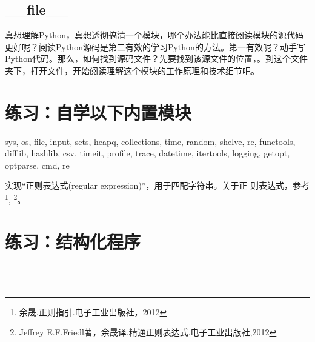 \subsection{\_\_file\_\_}
真想理解Python，真想透彻搞清一个模块，哪个办法能比直接阅读模块的源代码更好呢？阅读Python源码是第二有效的学习Python的方法。第一有效呢？动手写Python代码。那么，如何找到源码文件？先要找到该源文件的位置，。到这个文件夹下，打开文件，开始阅读理解这个模块的工作原理和技术细节吧。

\section{练习：自学以下内置模块}
\begin{python}
  sys, os, file, input, sets, heapq, collections, time, random,
  shelve, re, functools, difflib, hashlib, csv, timeit, profile,
  trace, datetime, itertools, logging, getopt, optparse, cmd, re
\end{python}
实现“正则表达式(regular expression)”，用于匹配字符串。关于正
则表达式，参考\footnote{余晟.正则指引.电子工业出版社，2012},
\footnote{Jeffrey E.F.Friedl著，余晟译.精通正则表达式.电子工业出版社,2012}。

\section{练习：结构化程序}
 \\
 \\

